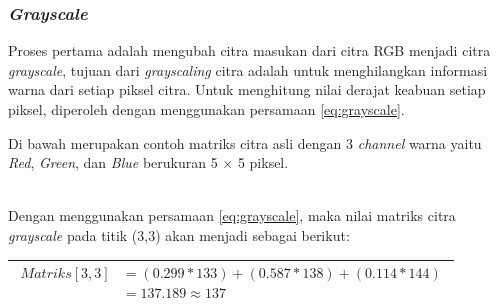 \subsubsection{\textit{Grayscale}}
\noindent Proses pertama adalah mengubah citra masukan dari citra RGB menjadi citra \textit{grayscale}, tujuan dari \textit{grayscaling} citra adalah untuk menghilangkan informasi warna dari setiap piksel citra. Untuk menghitung nilai derajat keabuan setiap piksel, diperoleh dengan menggunakan persamaan \ref{eq:grayscale}.

\noindent Di bawah merupakan contoh matriks citra asli dengan 3 \textit{channel} warna yaitu \textit{Red}, \textit{Green}, dan \textit{Blue} berukuran 5 $\times$ 5 piksel. \\

\begin{adjustbox}{width=1\textwidth}
	\noindent\begin{minipage}{\linewidth}
		\label{fig:MatriksCitraAsal}
	\end{minipage}
\end{adjustbox} \\

\noindent Dengan menggunakan persamaan \ref{eq:grayscale}, maka nilai matriks citra \textit{grayscale} pada titik (3,3) akan menjadi sebagai berikut:
\begin{table}[H]
	\begin{adjustbox}{width=1\textwidth}
		\begin{tabular}{|p{13.55cm}|}
			\hline
			\begin{equation}\nonumber
			\begin{aligned}
			Matriks[3,3] &= (0.299 * 133) + (0.587 * 138) + (0.114 * 144) \\
						 &= 137.189 \approx 137 
			\end{aligned}
			\end{equation}\\
			\hline
		\end{tabular}
	\end{adjustbox}
\end{table}

